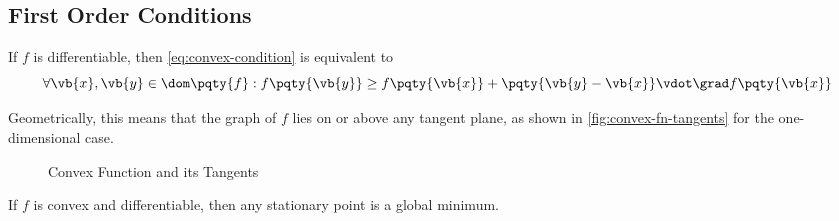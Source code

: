 \subsection{First Order Conditions}

\begin{theorem}
    \label{thm:first-order-condition}%
    If \(f\) is differentiable, then \eqref{eq:convex-condition} is equivalent to
    \begin{equation}
        \forall \vb{x}, \vb{y} \in \dom\pqty{f}: f\pqty{\vb{y}} \geq f\pqty{\vb{x}} + \pqty{\vb{y} - \vb{x}} \vdot \grad f\pqty{\vb{x}} \label{eq:first-order-condition}
    \end{equation}

    Geometrically, this means that the graph of \(f\) lies on or above any tangent plane, as shown in \autoref{fig:convex-fn-tangents} for the one-dimensional case.
\end{theorem}

\begin{figure}[ht!]
    \centering

    \caption{Convex Function and its Tangents}
    \label{fig:convex-fn-tangents}
\end{figure}

\begin{corollary}
    \label{cor:stationary-point-global-minimum}%
    If \(f\) is convex and differentiable, then any stationary point is a global minimum.
\end{corollary}

